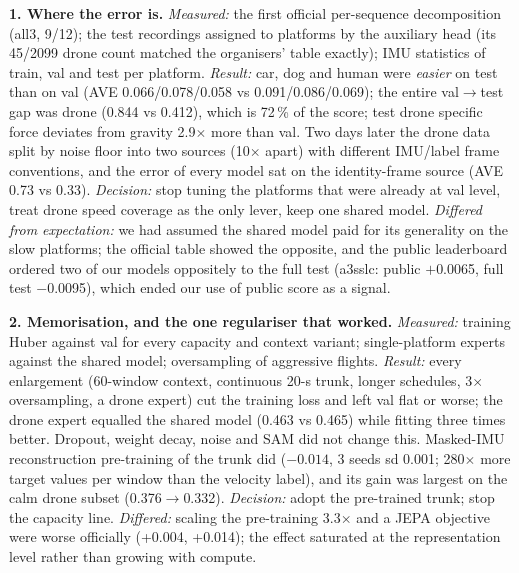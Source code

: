 \documentclass[letterpaper,10pt,conference]{ieeeconf}
\begin{document}
\textbf{1. Where the error is.} \emph{Measured:} the first official per-sequence decomposition
(all3, 9/12); the test recordings assigned to platforms by the auxiliary head (its 45/2099 drone
count matched the organisers' table exactly); IMU statistics of train, val and test per platform.
\emph{Result:} car, dog and human were \emph{easier} on test than on val (AVE 0.066/0.078/0.058
vs 0.091/0.086/0.069); the entire val$\to$test gap was drone (0.844 vs 0.412), which is 72\,\% of
the score; test drone specific force deviates from gravity 2.9$\times$ more than val. Two days
later the drone data split by noise floor into two sources (10$\times$ apart) with different
IMU/label frame conventions, and the error of every model sat on the identity-frame source
(AVE 0.73 vs 0.33). \emph{Decision:} stop tuning the platforms that were already at val level,
treat drone speed coverage as the only lever, keep one shared model. \emph{Differed from
expectation:} we had assumed the shared model paid for its generality on the slow platforms; the
official table showed the opposite, and the public leaderboard ordered two of our models
oppositely to the full test (a3sslc: public $+$0.0065, full test $-$0.0095), which ended our use of
public score as a signal.

\textbf{2. Memorisation, and the one regulariser that worked.} \emph{Measured:} training Huber
against val for every capacity and context variant; single-platform experts against the shared
model; oversampling of aggressive flights. \emph{Result:} every enlargement (60-window context,
continuous 20-s trunk, longer schedules, 3$\times$ oversampling, a drone expert) cut the training
loss and left val flat or worse; the drone expert equalled the shared model (0.463 vs 0.465)
while fitting three times better. Dropout, weight decay, noise and SAM did not change this.
Masked-IMU reconstruction pre-training of the trunk did ($-0.014$, 3 seeds sd 0.001; 280$\times$
more target values per window than the velocity label), and its gain was largest on the calm
drone subset (0.376$\to$0.332). \emph{Decision:} adopt the pre-trained trunk; stop the capacity
line. \emph{Differed:} scaling the pre-training 3.3$\times$ and a JEPA objective were worse
officially (+0.004, +0.014); the effect saturated at the representation level rather than growing
with compute.
\end{document}
